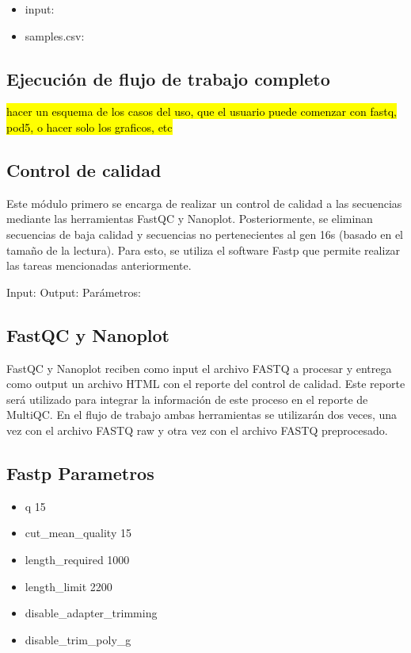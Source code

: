 \begin{itemize}
\begin{itemize}
\begin{itemize}
          \end{itemize}
    \item input:
    \item samples.csv:
\end{itemize}

\subsection{Ejecución de flujo de trabajo completo}
\hl{hacer un esquema de los casos del uso, que el usuario puede comenzar con fastq, pod5, o hacer solo los graficos, etc}
\subsection{Control de calidad}
Este módulo primero se encarga de realizar un control de calidad a las secuencias mediante las herramientas FastQC y Nanoplot.  Posteriormente, se eliminan secuencias de baja calidad y secuencias no pertenecientes al gen 16s (basado en el tamaño de la lectura). Para esto, se utiliza el software Fastp \cite{} que permite realizar las tareas mencionadas anteriormente.

Input:
Output:
Parámetros:


\subsection{FastQC y Nanoplot}
FastQC y Nanoplot reciben como input el archivo FASTQ a procesar y entrega como output un archivo HTML con el reporte del control de calidad. Este reporte será utilizado para integrar la información de este proceso en el reporte de MultiQC.
En el flujo de trabajo ambas herramientas se utilizarán dos veces, una vez con el archivo FASTQ raw y otra vez con el archivo FASTQ preprocesado.
\subsection{Fastp Parametros}

\begin{itemize}
    \item q 15
    \item cut\_mean\_quality 15
    \item length\_required 1000
    \item length\_limit 2200
    \item disable\_adapter\_trimming
    \item disable\_trim\_poly\_g
\end{itemize}


\end{itemize}
